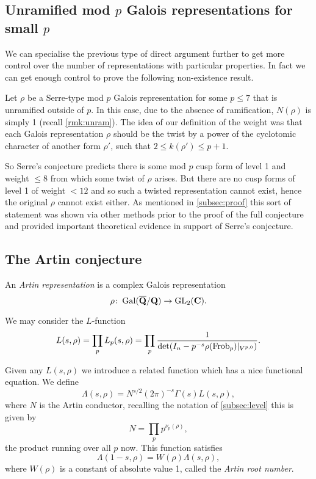 \documentclass[a4paper,12pt]{article}
\begin{document}
\subsection{Unramified mod $p$ Galois representations for small $p$}\label{subsec:small}
We can specialise the previous type of direct argument further to get more control over the number of representations with particular properties.
In fact we can get enough control to prove the following non-existence result.

Let $\rho$ be a Serre-type mod $p$ Galois representation for some $p \le 7$ that is unramified outside of $p$.
In this case, due to the absence of ramification, $N(\rho)$ is simply 1 (recall \cref{rmk:unram}).
The idea of our definition of the weight was that each Galois representation $\rho$ should be the twist by a power of the cyclotomic character of another form $\rho'$, such that $ 2\le k(\rho')\le p + 1$.

So Serre's conjecture predicts there is some mod $p$ cusp form of level 1 and weight $\le 8$ from which some twist of $\rho$ arises.
But there are no cusp forms of level 1 of weight $< 12$ and so such a twisted representation cannot exist, hence the original $\rho$ cannot exist either.
As mentioned in \cref{subsec:proof} this sort of statement was shown via other methods prior to the proof of the full conjecture and provided important theoretical evidence in support of Serre's conjecture.

\iffalse
\subsection{The Artin conjecture}\label{sec:artin}
\begin{defn}
An \emph{Artin representation} is a complex Galois representation
\[
\rho\colon \operatorname{Gal}(\overline{\mathbf{Q}}/\mathbf{Q}) \to \operatorname{GL}_2(\mathbf{C}).
\]
\end{defn}

We may consider the $L$-function
\[
L(s, \rho) = \prod_{p} L_p(s,\rho) = \prod_{p} \frac{1}{\det(I_n - p^{-s}\rho(\operatorname{Frob}_p) |_{V^{p,0}})}.
\]

Given any $L(s,\rho)$ we introduce a related function which has a nice functional equation.
We define
\[
\Lambda(s, \rho) = N^{s/2} (2\pi)^{-s} \Gamma(s)L(s,\rho),
\]
where $N$ is the Artin conductor, recalling the notation of \cref{subsec:level} this is given by
\[
N = \prod_{p}p^{\nu_p(\rho)},
\]
the product running over all $p$ now.
This function satisfies
\[
\Lambda(1-s, \rho) = W(\rho)\Lambda(s,\rho),
\]
where $W(\rho)$ is a constant of absolute value 1, called the \emph{Artin root number}.
\end{document}
